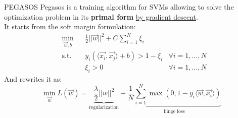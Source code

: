 \begin{frame}{PEGASOS}
Pegasos is a training algorithm for SVMs allowing to solve the optimization problem in its \textbf{primal form} \underline{by gradient descent}.\\
It starts from the soft margin formulation:
\begin{equation*}
\begin{aligned}
& \min_{\vec{w},b} & & \frac{1}{2}||\vec{w}||^2 + C\sum_{i=1}^N\xi_i\\
&\text{s.t.} & & y_i(\langle \vec{x_i},\vec{x_j}\rangle + b)>1-\xi_i & \forall i=1,\ldots,N\\
& & & \xi_i > 0 & \forall i=1,\ldots,N
\end{aligned}
\end{equation*}
And rewrites it as:
\begin{equation*}
\min_{\vec{w}} L(\vec{w}) = \underbrace{\frac{\lambda}{2}||w||^2}_{\text{regularization}} + \underbrace{\frac{1}{N} \sum_{i=1}^N \max(0, 1-y_i\langle\vec{w}, \vec{x_i}\rangle)}_{\text{hinge loss}}
\end{equation*}


\end{frame}